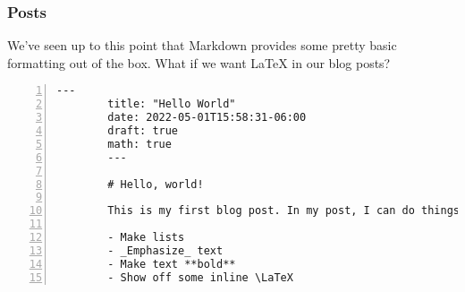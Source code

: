 \begin{frame}[fragile]
    \frametitle{Posts}

    We've seen up to this point that Markdown provides some pretty basic formatting out of the box.
    What if we want \LaTeX \: in our blog posts?

    \begin{lstlisting}[style=saneCode,gobble=8,title={content/hello-world.md},numbers=left]
        ---
        title: "Hello World"
        date: 2022-05-01T15:58:31-06:00
        draft: true
        math: true
        ---

        # Hello, world!

        This is my first blog post. In my post, I can do things like:

        - Make lists
        - _Emphasize_ text
        - Make text **bold**
        - Show off some inline \LaTeX
    \end{lstlisting}

\end{frame}